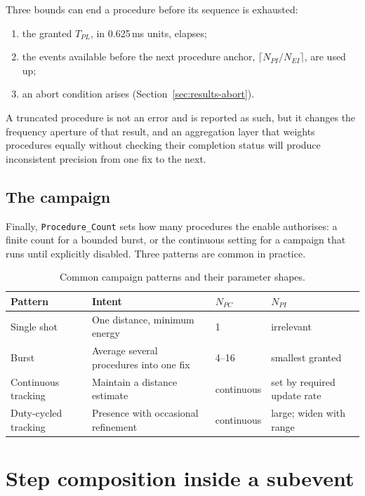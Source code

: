 \documentclass[11pt,a4paper]{article}
\newcommand{\code}[1]{\texttt{\small #1}}
\newcommand{\Nei}{N_{EI}}
\newcommand{\Npi}{N_{PI}}
\newcommand{\Npc}{N_{PC}}
\newcommand{\Tpl}{T_{PL}}
\begin{document}
Three bounds can end a procedure before its sequence is exhausted:

\begin{enumerate}[leftmargin=1.5em,itemsep=2pt]
\item the granted $\Tpl$, in 0.625\,ms units, elapses;
\item the events available before the next procedure anchor, $\lceil \Npi/\Nei \rceil$, are used up;
\item an abort condition arises (Section~\ref{sec:results-abort}).
\end{enumerate}

A truncated procedure is not an error and is reported as such, but it changes the frequency aperture
of that result, and an aggregation layer that weights procedures equally without checking their
completion status will produce inconsistent precision from one fix to the next.

\subsection{The campaign}

Finally, \code{Procedure\_Count} sets how many procedures the enable authorises: a finite count for a
bounded burst, or the continuous setting for a campaign that runs until explicitly disabled. Three
patterns are common in practice.

\begin{table}[h]
\caption{Common campaign patterns and their parameter shapes.}
\label{tab:patterns}
\centering\small
\begin{tabular}{@{}L{32mm}L{40mm}L{28mm}L{34mm}@{}}
\toprule
Pattern & Intent & $\Npc$ & $\Npi$ \\
\midrule
Single shot & One distance, minimum energy & 1 & irrelevant \\
Burst & Average several procedures into one fix & 4--16 & smallest granted \\
Continuous tracking & Maintain a distance estimate & continuous & set by required update rate \\
Duty-cycled tracking & Presence with occasional refinement & continuous & large; widen with range \\
\bottomrule
\end{tabular}
\end{table}

\section{Step composition inside a subevent}
\label{sec:steps}
\end{document}
